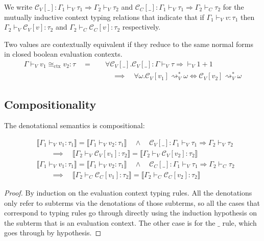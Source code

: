 \documentclass[acmsmall, screen, review, anonymous]{acmart}
\theoremstyle{definition}
\newcommand{\sem}[1]{\llbracket #1 \rrbracket}
\newcommand{\types}{\mathrel{:}}
\newcommand{\turnv}{\mathrel{\vdash_V}}
\newcommand{\turnc}{\mathrel{\vdash_C}}
\newcommand{\stepstoname}{\rightsquigarrow}
\newcommand{\reducestoname}{\stepstoname^{*}}
\newcommand{\reducestov}{\reducestoname_{V}}
\newcommand{\ctxeq}{\cong_{\mathrm{ctx}}}
\newcommand{\ctxv}[1]{\mathcal{C}_V[#1]}
\newcommand{\ctxc}[1]{\mathcal{C}_C[#1]}
\newcommand{\trans}{\Rightarrow}
\begin{document}
We write
$\ctxv{\_} \types \Gamma_1 \turnv \tau_1 \trans \Gamma_2 \turnv \tau_2$
and
$\ctxc{\_} \types \Gamma_1 \turnv \tau_1 \trans \Gamma_2 \turnc \tau_2$
for the mutually inductive context typing relations that indicate that
if $\Gamma_1 \turnv v \types \tau_1$ then
$\Gamma_2 \turnv \ctxv{v} \types \tau_2$ and
$\Gamma_2 \turnc \ctxc{v} \types \tau_2$ respectively.

Two values are contextually equivalent if they reduce to the same normal
forms in closed boolean evaluation contexts.
\begin{align*}
\Gamma \turnv v_1 \ctxeq v_2 \types \tau \quad = \quad
&\forall \ctxv{\_}.
  \ctxv{\_} \types \Gamma \turnv \tau \trans \turnv 1 + 1 \\
  &\quad \implies \quad
  \forall \omega.
  \ctxv{v_1} \reducestov \omega \iff \ctxv{v_2} \reducestov \omega
\end{align*}

\subsection{Compositionality}

The denotational semantics is compositional:
\begin{lemma}
\label{lemma:compositionality}
\begin{align*}
  &\sem{\Gamma_1 \turnv v_1 \types \tau_1}
    = \sem{\Gamma_1 \turnv v_2 \types \tau_1}
  \quad \wedge \quad \ctxv{\_} \types \Gamma_1 \turnv \tau_1 \trans \Gamma_2 \turnv \tau_2 \\
  &\qquad \implies \quad
  \sem{\Gamma_2 \turnv \ctxv{v_1} \types \tau_2}
  = \sem{\Gamma_2 \turnv \ctxv{v_2} \types \tau_2} \\
  &\sem{\Gamma_1 \turnv v_1 \types \tau_1}
    = \sem{\Gamma_1 \turnv v_2 \types \tau_1}
  \quad \wedge \quad \ctxc{\_} \types \Gamma_1 \turnv \tau_1 \trans \Gamma_2 \turnc \tau_2 \\
  &\qquad \implies \quad
  \sem{\Gamma_2 \turnc \ctxc{v_1} \types \tau_2}
  = \sem{\Gamma_2 \turnc \ctxc{v_2} \types \tau_2}
\end{align*}
\end{lemma}
\begin{proof}
  By induction on the evaluation context typing rules. All the
  denotations only refer to subterms via the denotations of those
  subterms, so all the cases that correspond to typing rules go through
  directly using the induction hypothesis on the subterm that is an
  evaluation context. The other case is for the $\_$ rule, which goes
  through by hypothesis.
\end{proof}
\end{document}
